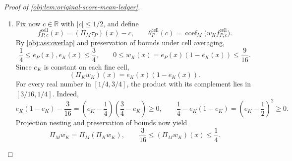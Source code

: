 \begin{proof}[Proof of \cref{obj:lem:original-score-mean-ledger}]
\begin{enumerate}
For each increment, self-adjointness at its two ranks gives
\[
\operatorname{coef}_M(e_PD_jr_{T_j})
=
\operatorname{coef}_M\bigl((D_je_P)r_{T_j}\bigr).
\]
The propensity Hölder estimate and \(R_j=2R_{j-1}\) imply
\[
\begin{aligned}
|D_je_P|
&\le |e_P-\Pi_{R_j}e_P|
+|e_P-\Pi_{R_{j-1}}e_P|\\
&\le20R_j^{-\alpha}+20R_{j-1}^{-\alpha}
\le40R_{j-1}^{-\alpha}
=a_j.
\end{aligned}
\]
Together with the pooled tail bound, this gives
\[
|(D_je_P)r_{T_j}|
\le10a_jT_j^{1-p}\quad\text{almost everywhere},
\qquad
\|\operatorname{coef}_M(e_PD_jr_{T_j})\|_2
\le10a_jT_j^{1-p}.
\]
Hence the complete tail vector satisfies
\[
\left\|
\theta^{\mathrm{tail}}_{P,M}(T_0)
+\sum_{j=1}^L\operatorname{coef}_M(e_PD_jr_{T_j})
\right\|_2
\le
20T_0^{1-p}
+10\sum_{j=1}^La_jT_j^{1-p}.
\]
Combining this with the original-mean error bound proves
\[
\|\theta_P(c)-\theta^{\mathrm{wt}}_P(c)\|_2
\le
400K^{-S}+20T_0^{1-p}
+10\sum_{j=1}^La_jT_j^{1-p}
=B.
\]
When \(L=0\), \(K=M\), both increment sums are empty, and the same identities reduce to the single correction at rank \(M\). Thus, in either branch, we have established for every real \(c\)
\[
\left\|
\theta_P(c)
-
\int_0^1w_K(x)(\tau_P(x)-c)F_M(x)\,d\lambda(x)
\right\|_2
\le B.
\]

\item
Fix now \(c\in\mathbb R\) with \(|c|\le1/2\), and define
\[
f^{\mathrm{cell}}_{P,c}(x)
=
(\Pi_M\tau_P)(x)-c,
\qquad
\theta^{\mathrm{cell}}_P(c)
=
\operatorname{coef}_M\bigl(w_Kf^{\mathrm{cell}}_{P,c}\bigr).
\]
By \cref{obj:ass:overlap} and preservation of bounds under cell averaging,
\[
\frac14\le e_P(x),e_K(x)\le\frac34,
\qquad
0\le w_K(x)=e_P(x)(1-e_K(x))\le\frac9{16}.
\]
Since \(e_K\) is constant on each fine cell,
\[
(\Pi_Kw_K)(x)=e_K(x)(1-e_K(x)).
\]
For every real number in \([1/4,3/4]\), the product with its complement lies in \([3/16,1/4]\). Indeed,
\[
e_K(1-e_K)-\frac3{16}
=
\left(e_K-\frac14\right)\left(\frac34-e_K\right)\ge0,
\qquad
\frac14-e_K(1-e_K)
=
\left(e_K-\frac12\right)^2\ge0.
\]
Projection nesting and preservation of bounds now yield
\[
\Pi_Mw_K=\Pi_M(\Pi_Kw_K),
\qquad
\frac3{16}\le(\Pi_Mw_K)(x)\le\frac14.
\]


\end{enumerate}
\end{proof}
